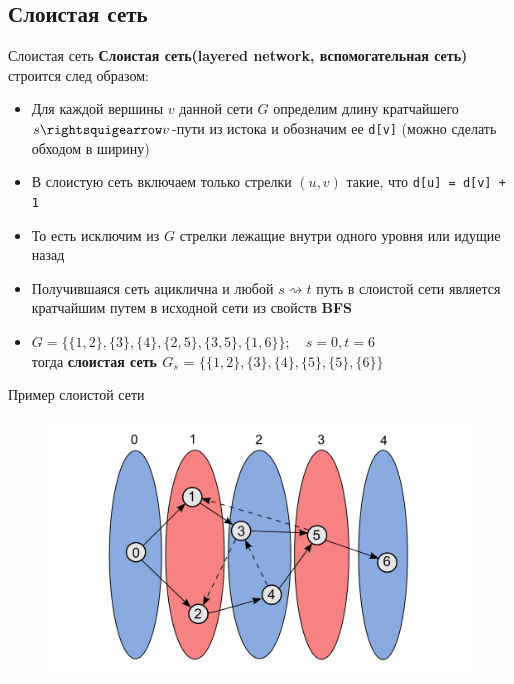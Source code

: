 \documentclass{beamer}
\begin{document}
\subsection{Слоистая сеть}

\begin{frame}{Слоистая сеть}
    \textbf{Слоистая сеть(layered network, вспомогательная сеть)} строится след образом:
    \begin{itemize}
        \item {
            Для каждой вершины $v$ данной сети $G$ определим длину кратчайшего $s \rightsquigearrow v$-пути из истока и обозначим ее \texttt{d[v]} (можно сделать обходом в ширину)
        }
        \item {
            В слоистую сеть включаем только стрелки $(u, v)$ такие, что \texttt{d[u] = d[v] + 1}
        }
        \item {
            То есть исключим из $G$ стрелки лежащие внутри одного уровня или идущие назад
        }
        \item {
            Получившаяся сеть ациклична и любой $s \rightsquigarrow t$ путь в слоистой сети является кратчайшим путем в исходной сети из свойств \textbf{BFS}
        }
        \item {
         $ G = \{\{1, 2\}, \{3\}, \{4\}, \{2, 5\}, \{3, 5\}, \{1, 6\}\}; \quad s = 0, t = 6$
         \\тогда \textbf{слоистая сеть $G_{s}$} = $\{\{1, 2\}, \{3\}, \{4\}, \{5\}, \{5\}, \{6\}\}$
        }
    \end{itemize}
\end{frame}

\begin{frame}{Пример слоистой сети}
    \begin{figure}[h!]
        \centering
        \includegraphics[scale=0.4]{network.png}
        \label{fig: blocking_flow}
    \end{figure}
\end{frame}
\end{document}
